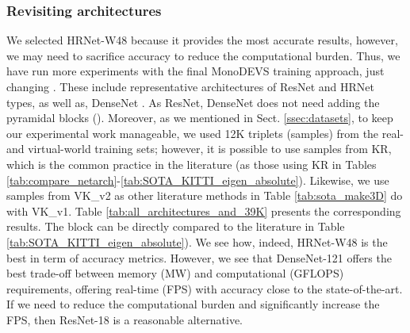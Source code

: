 \documentclass[journal]{IEEEtran}
\newcommand{\sSect}[1]{Sect. \ref{ssec:#1}}
\newcommand{\Tab}[1]{Table \ref{tab:#1}}
\begin{document}
\subsubsection{Revisiting  architectures} We selected HRNet-W48 because it provides the most accurate results, however, we may need to sacrifice accuracy to reduce the computational burden. Thus, we have run more experiments with the final MonoDEVS training approach, just changing . These include representative architectures of ResNet and HRNet types, as well as, DenseNet \cite{Huang:2019DenseNet}. As ResNet, DenseNet does not need adding the pyramidal blocks ().  Moreover, as we mentioned in \sSect{datasets}, to keep our experimental work manageable, we used 12K triplets (samples) from the real- and virtual-world training sets; however, it is possible to use  samples from KR, which is the common practice in the literature (as those using KR in Tables \ref{tab:compare_netarch}-\ref{tab:SOTA_KITTI_eigen_absolute}). Likewise, we use  samples from VK\_v2 as other literature methods in \Tab{sota_make3D} do with VK\_v1.  Table \ref{tab:all_architectures_and_39K} presents the corresponding results. The block  can be directly compared to the literature in  \Tab{SOTA_KITTI_eigen_absolute}). We see how, indeed, HRNet-W48 is the best in term of accuracy metrics. However, we see that DenseNet-121 offers the best trade-off between memory (MW) and computational (GFLOPS) requirements, offering real-time (FPS) with accuracy close to the state-of-the-art. If we need to reduce the computational burden and significantly increase the FPS, then ResNet-18 is a reasonable alternative.
\end{document}
